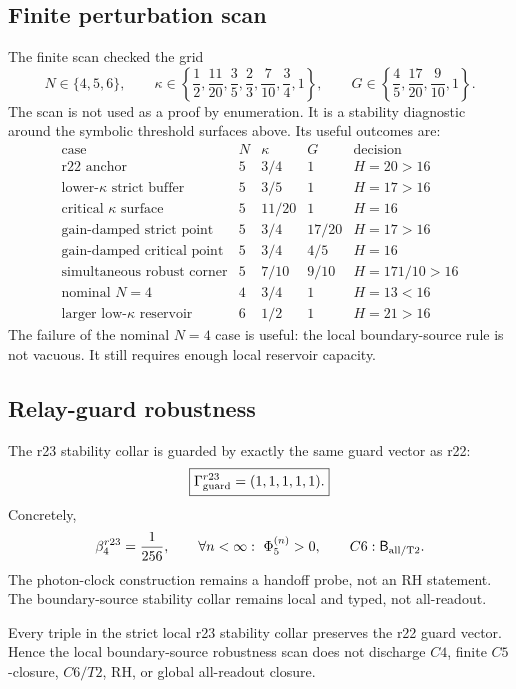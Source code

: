 \subsection{Finite perturbation scan}
\label{subsec:v470-r23-finite-perturbation-scan}

The finite scan checked the grid
\[
N\in\{4,5,6\},
\qquad
\kappa\in\left\{\frac12,\frac{11}{20},\frac35,\frac23,\frac7{10},\frac34,1\right\},
\qquad
G\in\left\{\frac45,\frac{17}{20},\frac9{10},1\right\}.
\]
The scan is not used as a proof by enumeration.  It is a stability diagnostic
around the symbolic threshold surfaces above.  Its useful outcomes are:
\[
\begin{array}{c|c|c|c|c}
\text{case} & N & \kappa & G & \text{decision}\\
\hline
\text{r22 anchor} & 5 & 3/4 & 1 & H=20>16\\
\text{lower-}\kappa\text{ strict buffer} & 5 & 3/5 & 1 & H=17>16\\
\text{critical }\kappa\text{ surface} & 5 & 11/20 & 1 & H=16\\
\text{gain-damped strict point} & 5 & 3/4 & 17/20 & H=17>16\\
\text{gain-damped critical point} & 5 & 3/4 & 4/5 & H=16\\
\text{simultaneous robust corner} & 5 & 7/10 & 9/10 & H=171/10>16\\
\text{nominal }N=4 & 4 & 3/4 & 1 & H=13<16\\
\text{larger low-}\kappa\text{ reservoir} & 6 & 1/2 & 1 & H=21>16
\end{array}
\]
The failure of the nominal \(N=4\) case is useful: the local boundary-source rule
is not vacuous.  It still requires enough local reservoir capacity.

\subsection{Relay-guard robustness}
\label{subsec:v470-r23-relay-guard-robustness}

The r23 stability collar is guarded by exactly the same guard vector as r22:
\[
\boxed{
\Gamma_{\rm guard}^{r23}=(1,1,1,1,1).
}
\]
Concretely,
\[
\beta_4^{r23}=\frac1{256},
\qquad
\forall n<\infty:\ \Phi_5^{(n)}>0,
\qquad
C6:\mathsf B_{\rm all/T2}.
\]
The photon-clock construction remains a handoff probe, not an RH statement.
The boundary-source stability collar remains local and typed, not all-readout.

\begin{proposition}
\label{prop:v470-r23-relay-guard-robustness}
Every triple in the strict local r23 stability collar preserves the r22 guard
vector.  Hence the local boundary-source robustness scan does not discharge
\(C4\), finite \(C5\)-closure, \(C6/T2\), RH, or global all-readout closure.
\end{proposition}

